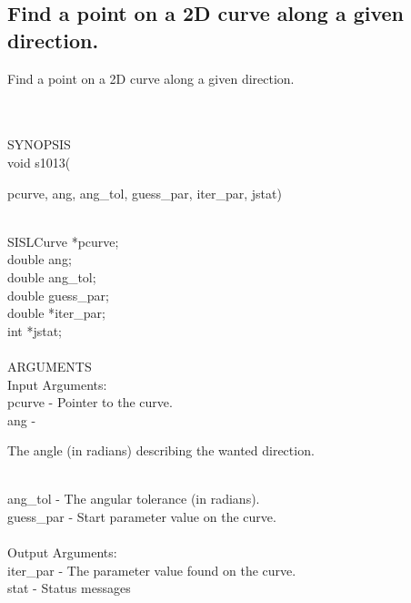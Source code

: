 \subsection{Find a point on a 2D curve along a given direction.}
\begin{minipg1}
  Find a point on a 2D curve along a given direction.
\end{minipg1}\\ \\
SYNOPSIS\\
        \>void s1013(\begin{minipg3}
        {\fov pcurve}, {\fov ang}, {\fov ang\_tol}, {\fov guess\_par}, {\fov iter\_par}, {\fov jstat})
      \end{minipg3}\\[0.3ex]
      \>\>      SISLCurve \>  *{\fov pcurve};\\
      \>\>      double    \>   {\fov ang};\\
      \>\>      double    \>   {\fov ang\_tol};\\
      \>\>      double    \>   {\fov guess\_par};\\
      \>\>      double    \>  *{\fov iter\_par};\\
      \>\>      int       \>  *{\fov jstat};\\
\\
ARGUMENTS\\
        \>Input Arguments:\\
        \>\>    {\fov pcurve}    \> - \> Pointer to the curve.\\
        \>\>    {\fov ang}       \> - \> \begin{minipg2}
                                           The angle (in radians)
                                           describing the wanted
                                           \mbox{direction}.
                                         \end{minipg2}\\[0.8ex]
        \>\>    {\fov ang\_tol}  \> - \> The angular tolerance (in radians).\\
        \>\>    {\fov guess\_par}\> - \> Start parameter value on the curve.\\
\\
        \>Output Arguments:\\
        \>\>    {\fov iter\_par} \> - \> The parameter value found on the curve.\\
        \>\>    {\fov stat}     \> - \> Status messages\\
